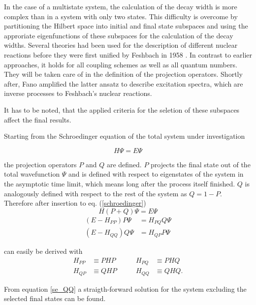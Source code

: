 In the case of a multistate system, the calculation of the decay width is more
complex than in a system with only two states.
This difficulty is overcome by partitioning the Hilbert space into initial and final
state subspaces and using the approriate eigenfunctions of these subspaces for the
calculation of the decay widths. 
Several theories had been used for the description of different nuclear reactions
before they were first unified by Feshbach in 1958 \cite{Feshbach58,Feshbach62,Feshbach_book}.
In contrast to earlier approaches, it holds for all coupling schemes as well as
all quantum numbers. They will be taken care of in the definition of the
projection operators.
Shortly after,
Fano amplified the latter ansatz to describe excitation spectra, which
are inverse processes to Feshbach's nuclear reactions.\cite{Fano61}

It has to be noted, that the applied criteria for the seletion of
these subspaces affect the final results.

Starting from the Schroedinger equation of the total system under investigation

\begin{equation}
  H \Psi = E \Psi \label{schroedinger}
\end{equation}

the projection operators $P$ and $Q$ are defined. $P$ projects the final state out
of the total wavefunction $\Psi$ and is defined with respect to eigenstates
of the system in the asymptotic time limit, which means long after the process
itself finished. $Q$ is analogously defined with respect to the rest of the
system as $Q = 1 - P$. Therefore after insertion to eq. (\ref{schroedinger})
\begin{equation}
  H (P+Q) \Psi = E \Psi
\end{equation}
\begin{align}
  (E - H_{PP}) P \Psi & = H_{PQ} Q \Psi \label{se_PP}\\
  (E - H_{QQ}) Q \Psi & = H_{QP} P \Psi \label{se_QQ}
\end{align}

can easily be derived with
\begin{align*}
  H_{PP} & \equiv PHP & \quad\quad H_{PQ} & \equiv PHQ\\
  H_{QP} & \equiv QHP & \quad\quad H_{QQ} & \equiv QHQ .
\end{align*}

From equation \ref{se_QQ} a straigth-forward solution for the system excluding
the selected final states can be found.

